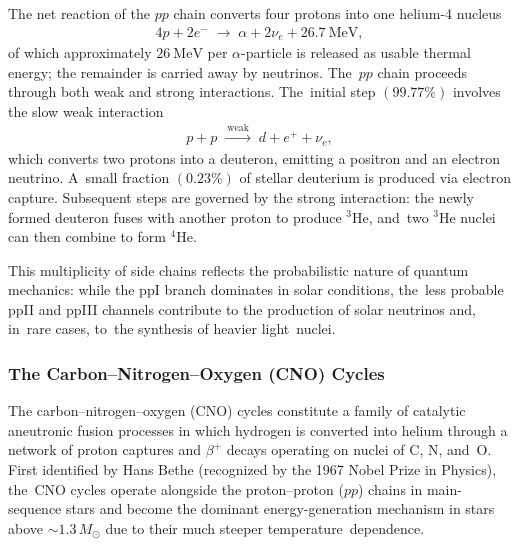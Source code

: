\documentclass[particles,article,accept,pdftex,moreauthors]{Definitions/mdpi}
\begin{document}
The net reaction of the $pp$ chain converts four protons into one helium-4 nucleus
\begin{align}
4p + 2e^- \;\longrightarrow\; \alpha + 2\nu_{e} + 26.7~\mathrm{MeV},
\end{align}
of which approximately $26~\mathrm{MeV}$ per $\alpha$-particle is released as usable thermal energy; the remainder is carried away by neutrinos. The~$pp$ chain proceeds through both weak and strong interactions. The~initial step $(99.77\%)$ involves the slow weak interaction
\begin{align}
p + p \;\xrightarrow{\ \mathrm{weak}\ }\; d + e^{+} + \nu_{e},
\end{align}
which converts two protons into a deuteron, emitting a positron and an electron neutrino. A~small fraction $(0.23\%)$ of stellar deuterium is produced via electron capture. Subsequent steps are governed by the strong interaction: the newly formed deuteron fuses with another proton to produce ${}^{3}\mathrm{He}$, and~two ${}^{3}\mathrm{He}$ nuclei can then combine to form ${}^{4}\mathrm{He}$.

This multiplicity of side chains reflects the probabilistic nature of quantum mechanics: while the ppI branch dominates in solar conditions, the~less probable ppII and ppIII channels contribute to the production of solar neutrinos and, in~rare cases, to~the synthesis of heavier light~nuclei.

\subsubsection{The Carbon--Nitrogen--Oxygen (CNO) Cycles}\label{sec:CNOcycle}

The carbon--nitrogen--oxygen (CNO) cycles constitute a family of catalytic aneutronic fusion processes in which hydrogen is converted into helium through a network of proton captures and $\beta^{+}$ decays operating on nuclei of C, N, and~O. First identified by Hans Bethe (recognized by the 1967 Nobel Prize in Physics), the~CNO cycles operate alongside the proton--proton ($pp$) chains in main-sequence stars and become the dominant energy-generation mechanism in stars above $\sim$$1.3\,M_{\odot}$ due to their much steeper temperature~dependence.
\end{document}
